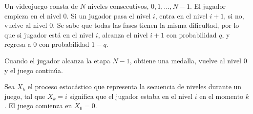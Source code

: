 \ifspanish

Un videojuego consta de $N$ niveles consecutivos, $0, 1, ..., N-1$. El jugador empieza en el nivel 0. Si un jugador pasa el nivel $i$, entra en el nivel $i+1$, si no, vuelve al nivel 0. Se sabe que todas las fases tienen la misma dificultad, por lo que si jugador está en el nivel $i$, alcanza el nivel $i+1$ con probabilidad $q$, y regresa a 0 con probabilidad $1-q$.

Cuando el jugador alcanza la etapa $N-1$, obtiene una medalla, vuelve al nivel 0 y el juego continúa.

Sea $X_k$ el proceso estocástico que representa la secuencia de niveles durante un juego, tal que $X_k=i$ significa que el jugador estaba en el nivel $i$ en el momento $k$. El juego comienza en $X_0=0$.

